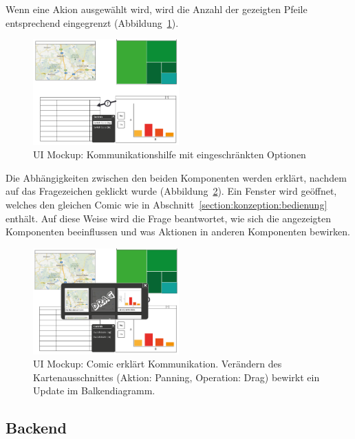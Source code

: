 \documentclass[
	headsepline,
	footsepline,
	fontsize=12pt,
	bibliography=totoc
]{scrbook}
\begin{document}
Wenn eine Akion ausgewählt wird, wird die Anzahl der gezeigten Pfeile entsprechend eingegrenzt (Abbildung~\ref{figure:kommunikation-step2}).

\begin{figure}[htbp]
   \centering
   \includegraphics[width=0.5\textwidth]{images/konzeption-kommunikation-step2.png}
   \caption{UI Mockup: Kommunikationshilfe mit eingeschränkten Optionen}
   \label{figure:kommunikation-step2}
\end{figure}

Die Abhängigkeiten zwischen den beiden Komponenten werden erklärt, nachdem auf das Fragezeichen geklickt wurde (Abbildung~\ref{figure:kommunikation-step3}). Ein Fenster wird geöffnet, welches den gleichen Comic wie in Abschnitt~\ref{section:konzeption:bedienung} enthält. Auf diese Weise wird die Frage beantwortet, wie sich die angezeigten Komponenten beeinflussen und was Aktionen in anderen Komponenten bewirken.

\begin{figure}[htbp]
   \centering
   \includegraphics[width=0.5\textwidth]{images/konzeption-kommunikation-step3.png}
   \caption{UI Mockup: Comic erklärt Kommunikation. Verändern des Kartenausschnittes (Aktion: Panning, Operation: Drag) bewirkt ein Update im Balkendiagramm.}
   \label{figure:kommunikation-step3}
\end{figure}

\subsection{Backend}
\label{section:konzeption:kommunikation:backend}
\end{document}
